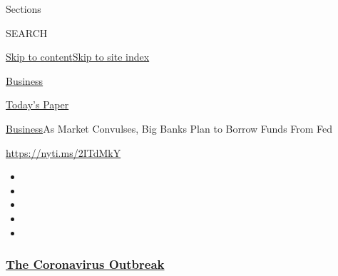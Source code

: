 Sections

SEARCH

\protect\hyperlink{site-content}{Skip to
content}\protect\hyperlink{site-index}{Skip to site index}

\href{https://www.nytimes3xbfgragh.onion/section/business}{Business}

\href{https://myaccount.nytimes3xbfgragh.onion/auth/login?response_type=cookie\&client_id=vi}{}

\href{https://www.nytimes3xbfgragh.onion/section/todayspaper}{Today's
Paper}

\href{/section/business}{Business}\textbar{}As Market Convulses, Big
Banks Plan to Borrow Funds From Fed

\url{https://nyti.ms/2ITdMkY}

\begin{itemize}
\item
\item
\item
\item
\item
\end{itemize}

\hypertarget{the-coronavirus-outbreak}{%
\subsubsection{\texorpdfstring{\href{https://www.nytimes3xbfgragh.onion/news-event/coronavirus?name=styln-coronavirus-markets\&region=TOP_BANNER\&block=storyline_menu_recirc\&action=click\&pgtype=Article\&impression_id=3f6f9280-f4c6-11ea-8682-bfbfb46aa2bd\&variant=undefined}{The
Coronavirus
Outbreak}}{The Coronavirus Outbreak}}\label{the-coronavirus-outbreak}}

